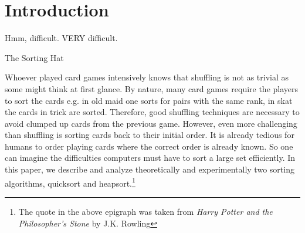 \section{Introduction}
\vspace{2cm}
\epigraph{Hmm, difficult. VERY difficult.}{The Sorting Hat}
Whoever played card games intensively knows that shuffling is not as trivial as some might think at first glance. By nature, many card games require the players to sort the cards e.g. in old maid one sorts for pairs with the same rank, in skat the cards in trick are sorted. Therefore, good shuffling techniques are necessary to avoid clumped up cards from the previous game. However, even more challenging than shuffling is sorting cards back to their initial order. It is already tedious for humans to order playing cards where the correct order is already known. So one can imagine the difficulties computers must have to sort a large set efficiently. In this paper, we describe and analyze theoretically and experimentally two sorting algorithms, quicksort and heapsort.\footnote{The quote in the above epigraph was taken from \textit{Harry Potter and the Philosopher's Stone} by J.K. Rowling}